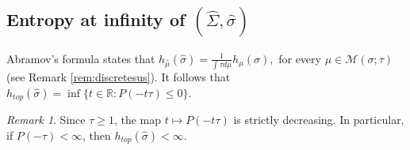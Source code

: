 \documentclass[letterpaper,11pt]{amsart}
\theoremstyle{plain}
\theoremstyle{plain}
\newtheorem{lemma}[proposition]{Lemma}
\theoremstyle{definition}
\theoremstyle{remark}
\newtheorem{remark}{Remark}[section]
\def\R{{\mathbb R}}
\def\M{{\mathcal M}}
\begin{document}
\subsection{Entropy at infinity of $(\widehat{\Sigma},\widehat{\sigma})$} Abramov's formula states that $h_{\widehat{\mu}}(\widehat{\sigma})=\frac{1}{\int {\tau} d\mu}h_\mu(\sigma),$ for every $\mu\in \M(\sigma;\tau)$ (see Remark \ref{rem:discretesus}). It follows that $h_{top}(\widehat{\sigma})=\inf\{t\in\R: P(-t{\tau})\le 0\}.$

\begin{remark}\label{rem:finent} Since $\tau\ge 1$, the map $t\mapsto P(-t\tau)$ is strictly decreasing. In particular, if $P(-{\tau})<\infty$, then $h_{top}(\widehat{\sigma})<\infty$. \end{remark}

\end{document}
